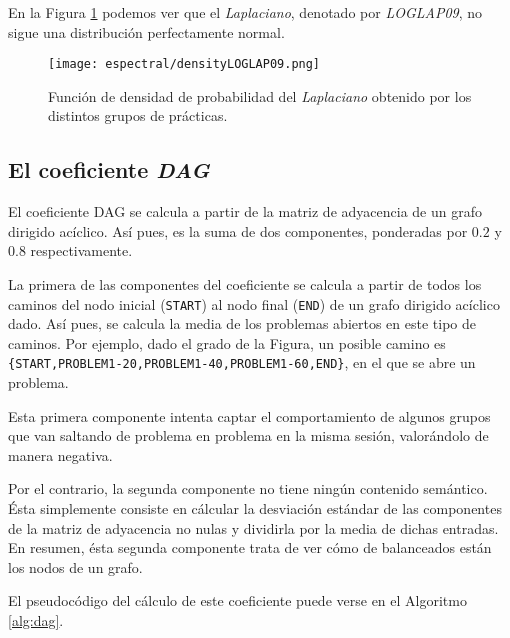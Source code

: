 En la Figura \ref{fig:densityplotlaplacian} podemos ver que el \emph{Laplaciano}, denotado por \emph{LOGLAP09}, no sigue una distribución perfectamente normal.

\begin{figure}[H]
    \centering
    \texttt{[image: espectral/densityLOGLAP09.png]}
    \caption{Función de densidad de probabilidad del \emph{Laplaciano} obtenido por los distintos grupos de prácticas.}
    \label{fig:densityplotlaplacian}
\end{figure}

\subsection{El coeficiente \emph{DAG}}

El coeficiente DAG se calcula a partir de la matriz de adyacencia de un
grafo dirigido acíclico. Así pues, es la suma de dos componentes, ponderadas
por $0.2$ y $0.8$ respectivamente.

La primera de las componentes del coeficiente se calcula a partir de todos
los caminos del nodo inicial (\texttt{START}) al nodo final (\texttt{END}) de un grafo dirigido
acíclico dado. Así pues, se calcula la media de los problemas abiertos en
este tipo de caminos. Por ejemplo, dado el grado de la Figura,
un posible camino es \texttt{\{START,PROBLEM1-20,PROBLEM1-40,PROBLEM1-60,END\}}, en el que se abre un problema.


Esta primera componente intenta captar el comportamiento de algunos grupos
que van saltando de problema en problema en la misma sesión, valorándolo
de manera negativa.

Por el contrario, la segunda componente no tiene ningún contenido semántico.
Ésta simplemente consiste en cálcular la desviación estándar de las componentes
de la matriz de adyacencia no nulas y dividirla por la media de dichas entradas.
En resumen, ésta segunda componente trata de ver cómo de balanceados están
los nodos de un grafo.

El pseudocódigo del cálculo de este coeficiente puede verse en el Algoritmo
\ref{alg:dag}.

